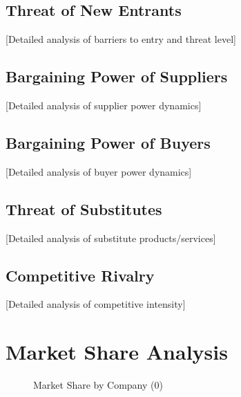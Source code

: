 \documentclass[11pt,letterpaper]{report}
\newcommand{\baseyear}{0}
\begin{document}
\subsection{Threat of New Entrants}
[Detailed analysis of barriers to entry and threat level]

\subsection{Bargaining Power of Suppliers}
[Detailed analysis of supplier power dynamics]

\subsection{Bargaining Power of Buyers}
[Detailed analysis of buyer power dynamics]

\subsection{Threat of Substitutes}
[Detailed analysis of substitute products/services]

\subsection{Competitive Rivalry}
[Detailed analysis of competitive intensity]

\section{Market Share Analysis}


\begin{figure}[htbp]
\centering
\caption{Market Share by Company (\baseyear{})}
\label{fig:market_share}
\end{figure}
\end{document}

